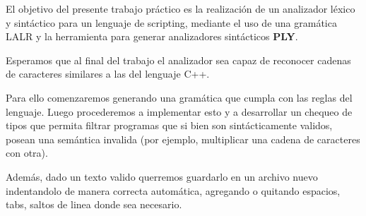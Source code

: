 El objetivo del presente trabajo práctico es la realización de un analizador léxico y sintáctico para un lenguaje de scripting, mediante el uso de una gramática LALR y la herramienta para generar analizadores sintácticos \textbf{PLY}.

Esperamos que al final del trabajo el analizador sea capaz de reconocer cadenas de caracteres similares a las del lenguaje C++.

Para ello comenzaremos generando una gramática que cumpla con las reglas del lenguaje. Luego procederemos a implementar esto y a desarrollar un chequeo de tipos que permita filtrar programas que si bien son sintácticamente validos, posean una semántica invalida (por ejemplo, multiplicar una cadena de caracteres con otra).

Además, dado un texto valido querremos guardarlo en un archivo nuevo indentandolo de manera correcta automática, agregando o quitando espacios, tabs, saltos de linea donde sea necesario.

